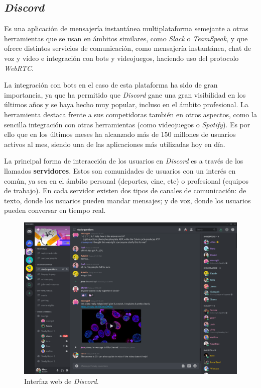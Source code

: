 \subsection{\textit{Discord}}

Es una aplicación de mensajería instantánea multiplataforma semejante a otras herramientas que se usan en ámbitos similares, como \textit{Slack} o \textit{TeamSpeak}, y que ofrece distintos servicios de comunicación, como mensajería instantánea, chat de voz y vídeo e integración con bots y videojuegos, haciendo uso del protocolo \textit{WebRTC}.

La integración con bots en el caso de esta plataforma ha sido de gran importancia, ya que ha permitido que \textit{Discord} gane una gran visibilidad en los últimos años y se haya hecho muy popular, incluso en el ámbito profesional. La herramienta destaca frente a sus competidoras también en otros aspectos\cite{earthweb}, como la sencilla integración con otras herramientas (como videojuegos o \textit{Spotify}). Es por ello que en los últimos meses ha alcanzado más de 150 millones de usuarios activos al mes, siendo una de las aplicaciones más utilizadas hoy en día.

La principal forma de interacción de los usuarios en \textit{Discord} es a través de los llamados \textbf{servidores}. Estos son  comunidades de usuarios con un interés en común, ya sea en el ámbito personal (deportes, cine, etc) o profesional (equipos de trabajo). En cada servidor existen dos tipos de canales de comunicación: de texto, donde los usuarios pueden mandar mensajes; y de voz, donde los usuarios pueden conversar en tiempo real.

\begin{figure}[H]
	\centering
	\includegraphics[width=1\textwidth]{img/discord.png}
	\caption{Interfaz web de \textit{Discord}.}
\end{figure}



